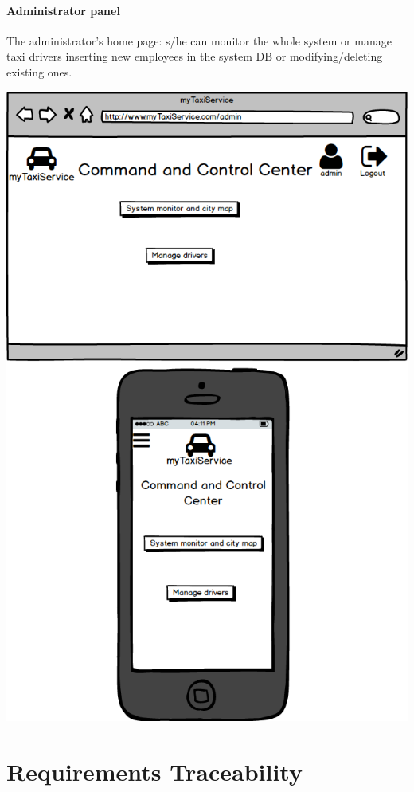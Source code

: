 \documentclass[a4paper,11pt]{report} %
\begin{document}
	\paragraph{Administrator panel} The administrator's home page: s/he can monitor the whole system or manage taxi drivers inserting new employees in the system DB or modifying/deleting existing ones.
	\begin{center}
		\includegraphics[width=0.9\linewidth]{Pictures/AdminPage}
	\end{center}
	\pagebreak	
	
	\section{Requirements Traceability}
	
\end{document}
